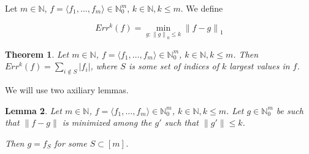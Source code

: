\documentclass[11pt]{amsart}
\newtheorem{theorem}{Theorem}[section]
\newtheorem{lemma}[theorem]{Lemma}
\newenvironment{definition}[1][Definition]{\begin{trivlist}
\item[\hskip \labelsep {\bfseries #1}]}{\end{trivlist}}
\newcommand{\norm}[1]{\left\lVert #1 \right\rVert}
\begin{document}
\begin{definition}
Let $m \in \mathbb{N}$, $f = \langle f_1, \dots, f_m \rangle \in \mathbb{N}_0^m$, $k \in \mathbb{N}, k \le m$. We define

$$
Err^k(f) = \min_{g : \norm{g}_0 \le k}{\norm{f - g}_1}
$$
\end{definition}

\begin{theorem}
Let $m \in \mathbb{N}$, $f = \langle f_1, \dots, f_m \rangle \in \mathbb{N}_0^m$, $k \in \mathbb{N}, k \le m$. Then $Err^k(f) = \sum_{i \not\in S} |f_i|$, where $S$ is some set of indices of $k$ largest values in $f$.
\end{theorem}

We will use two axiliary lemmas.

\begin{lemma}\label{lemS1}
Let $m \in \mathbb{N}$, $f = \langle f_1, \dots, f_m \rangle \in \mathbb{N}_0^m$, $k \in \mathbb{N}, k \le m$. Let $g \in \mathbb{N}_0^m$ be such that $\norm{f - g}$ is minimized among the $g'$ such that $\norm{g'} \le k$.

Then $g = f_S$ for some $S \subset [m]$.
\end{lemma}
\end{document}
